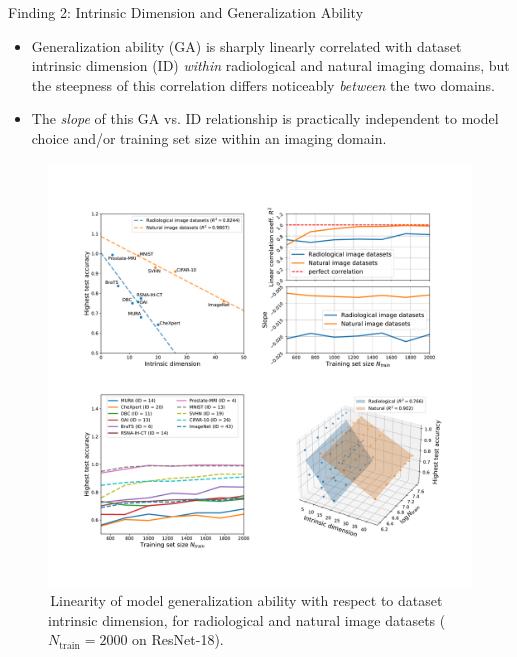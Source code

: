 \documentclass[final,hyperref={pdfpagelabels=false}]{beamer}
\begin{document}
\begin{frame}[t]
\begin{columns}[t]
\begin{column}{.47\textwidth}

\begin{block}{Finding 2: Intrinsic Dimension and Generalization Ability}
\begin{itemize}
    \item Generalization ability (GA) is sharply linearly correlated with dataset intrinsic dimension (ID) \textit{within} radiological and natural imaging domains, but the steepness of this correlation differs noticeably \textit{between} the two domains.
    \item The \textit{slope} of this GA vs. ID relationship is practically independent to model choice and/or training set size within an imaging domain.
\end{itemize}
\begin{figure}
   \label{fig:linear}
   \includegraphics[width=0.75\linewidth]{frompaper/main_fig_multi_0.pdf}
   \caption{\,Linearity of model generalization ability with respect to dataset intrinsic dimension, for \textcolor{paperblue}{radiological} and \textcolor{paperorange}{natural} image datasets ($N_\text{train}=2000$ on ResNet-18).}
\end{figure}
\end{block}


\end{column}
\end{columns}
\end{frame}
\end{document}
